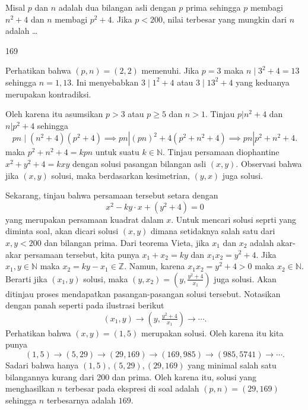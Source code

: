 \documentclass[12pt]{scrartcl}
\begin{document}
\begin{soalbaru}
Misal $p$ dan $n$ adalah dua bilangan asli dengan $p$ prima sehingga $p$ membagi $n^2+4$ dan $n$ membagi $p^2+4$. Jika $p<200$, nilai terbesar yang mungkin dari $n$ adalah \dots
\end{soalbaru}
\begin{jawaban}
169
\end{jawaban}
\begin{solusi}
Perhatikan bahwa $(p,n) = (2,2)$ memenuhi. Jika $p = 3$ maka $n \mid 3^2+4 = 13$ sehingga $n=1,13$. Ini menyebabkan $3 \mid 1^2+4$ atau $3 \mid 13^2 + 4$ yang keduanya merupakan kontradiksi. 

Oleh karena itu asumsikan $p> 3$ atau $p \ge 5$ dan $n > 1$. Tinjau $p | n^2+4$ dan $n | p^2+4$ sehingga
$$pn \mid (n^2+4)(p^2+4) \implies pn | (pn)^2 + 4(p^2 + n^2 + 4) \implies pn | p^2+n^2+4.$$
maka $p^2+n^2+4 = kpn$ untuk suatu $k\in \mathbb{N}$. Tinjau persamaan diophantine $x^2+y^2+4=kxy$ dengan solusi pasangan bilangan asli $(x,y)$. Observasi bahwa jika $(x,y)$ solusi, maka berdasarkan kesimetrian, $(y,x)$ juga solusi. 

Sekarang, tinjau bahwa persamaan tersebut setara dengan
$$x^2 -ky \cdot x + (y^2+4)=0$$
yang merupakan persamaan kuadrat dalam $x$. Untuk mencari solusi seprti yang diminta soal, akan dicari solusi $(x,y)$ dimana setidaknya salah satu dari $x,y < 200$ dan bilangan prima. Dari teorema Vieta, jika $x_1$ dan $x_2$ adalah akar-akar persamaan tersebut, kita punya $x_1 + x_2 = ky$ dan $x_1x_2 = y^2+4$. Jika $x_1, y \in \mathbb{N}$ maka $x_2 = ky - x_1 \in \mathbb{Z}$. Namun, karena $x_1x_2 = y^2 + 4 > 0$ maka $x_2 \in \mathbb{N}$. Berarti jika $(x_1, y)$ solusi, maka $(y, x_2) = (y, \frac{y^2+4}{x_1})$ juga solusi. Akan ditinjau proses mendapatkan pasangan-pasangan solusi tersebut. Notasikan dengan panah seperti pada ilustrasi berikut
$$(x_1, y) \rightarrow (y, \tfrac{y^2+4}{x_1}) \rightarrow \cdots .$$
Perhatikan bahwa $(x,y)=(1,5)$ merupakan solusi. Oleh karena itu kita punya
$$(1,5) \rightarrow (5,29) \rightarrow (29, 169) \rightarrow (169, 985) \rightarrow (985, 5741) \rightarrow \cdots .$$
Sadari bahwa hanya $(1,5),(5,29),(29,169)$ yang minimal salah satu bilangannya kurang dari 200 dan prima. Oleh karena itu, solusi yang menghasilkan $n$ terbesar pada ekspresi di soal adalah $(p,n) = (29, 169)$ sehingga $n$ terbesarnya adalah $\boxed{169}$.
\end{solusi}
\end{document}
